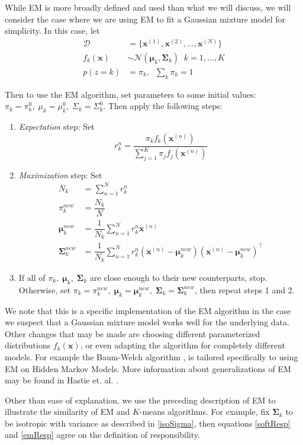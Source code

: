 While EM is more broadly defined and used than what we will discuss, we will consider the case where we are using EM to fit a Gaussian mixture model for simplicity.  In this case, let 
\begin{align}
	\mathcal{D} &= \{\bm x^{(1)},\bm x^{(2)},\ldots,\bm x^{(N)}\} \nonumber \\
	f_k(\bm x) &\sim \mathcal{N}(\bm \mu_k,\bm \Sigma_k)\;\; k=1,\ldots,K\\
	 p(z=k) &=\pi_{k},   \;\; \sum_{k} \pi_{k} = 1	
\end{align}

Then to use the EM algorithm, set parameters to some initial values: \( \pi_{k}=\pi_{k}^0,\; \mu_{k}=\mu_{k}^0,\; \Sigma_{k}=\Sigma_{k}^0\). Then apply the following steps:
\begin{enumerate}
	\item \textit{Expectation} step: Set 
		\begin{equation}\label{emResp}
		 r_k^n = \frac{\pi_k f_k(\bm x^{(n)})}{\sum_{j=1}^K \pi_j f_j(\bm x^{(n)})}
		\end{equation}
	\item \textit{Maximization} step: Set
	\begin{align}
		N_k &= \sum_{n=1}^{N}r_k^{n}\\
		\pi_k^{new} &= \dfrac{N_k}{N}\\
		\bm \mu_{k}^{new} &= \dfrac{1}{N_k}\sum_{n=1}^{N} r_k^{n}\bm x^{(n)}\\
		\bm \Sigma_k^{new} &= \dfrac{1}{N_k}\sum_{n=1}^{N}r_k^{n} (\bm x^{(n)}-\bm \mu_{k}^{new})(\bm x^{(n)}-\bm \mu_{k}^{new})^{\intercal}
	\end{align}
	\item If all of \( \pi_k, \;\bm\mu_k,\;\bm\Sigma_k \) are close enough to their new counterparts, stop.  Otherwise, set \( \pi_k = \pi_k^{new}, \;\bm\mu_k = \bm\mu_{k}^{new}, \;\bm\Sigma_k = \bm\Sigma_k^{new}\), then repeat steps 1 and 2.
\end{enumerate}

We note that this is a specific implementation of the EM algorithm in the case we suspect that a Gaussian mixture model works well for the underlying data.  Other changes that may be made are choosing different parameterized distributions \( f_k(\bm x) \), or even adapting the algorithm for completely different models. For example the Baum-Welch algorithm \cite{baum1970}, is tailored  specifically to using EM on Hidden Markov Models. More information about generalizations of EM may be found in Hastie et. al. \citep[p.276]{hastie09esl}.

Other than ease of explanation, we use the preceding description of EM to illustrate the similarity of EM and \( K \)-means algorithms.  For example, fix \( \bm\Sigma_{k} \) to be isotropic with variance as described in \ref{isoSigma}, then equations \ref{softResp} and \ref{emResp} agree on the definition of responsibility.  %